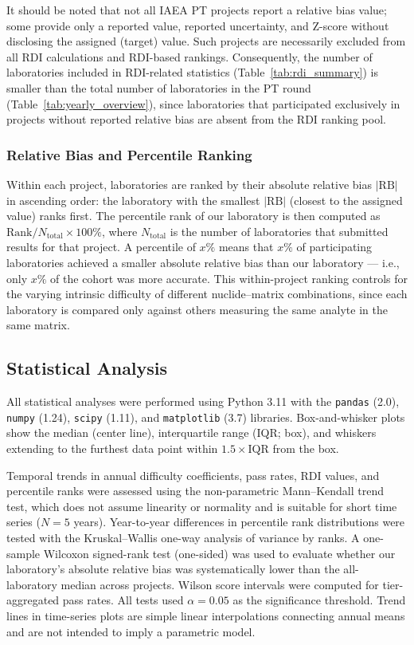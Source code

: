 \documentclass[12pt,a4paper,twoside]{article}
\begin{document}
It should be noted that not all IAEA PT projects report a relative bias value; some provide only a reported value, reported uncertainty, and Z-score without disclosing the assigned (target) value. Such projects are necessarily excluded from all RDI calculations and RDI-based rankings. Consequently, the number of laboratories included in RDI-related statistics (Table~\ref{tab:rdi_summary}) is smaller than the total number of laboratories in the PT round (Table~\ref{tab:yearly_overview}), since laboratories that participated exclusively in projects without reported relative bias are absent from the RDI ranking pool.

\subsubsection{Relative Bias and Percentile Ranking}

Within each project, laboratories are ranked by their absolute relative bias $|\text{RB}|$ in ascending order: the laboratory with the smallest $|\text{RB}|$ (closest to the assigned value) ranks first. The percentile rank of our laboratory is then computed as $\text{Rank}/N_{\text{total}} \times 100\%$, where $N_{\text{total}}$ is the number of laboratories that submitted results for that project. A percentile of $x\%$ means that $x\%$ of participating laboratories achieved a smaller absolute relative bias than our laboratory — i.e., only $x\%$ of the cohort was more accurate. This within-project ranking controls for the varying intrinsic difficulty of different nuclide--matrix combinations, since each laboratory is compared only against others measuring the same analyte in the same matrix.

\subsection{Statistical Analysis}

All statistical analyses were performed using Python 3.11 with the \texttt{pandas} (2.0), \texttt{numpy} (1.24), \texttt{scipy} (1.11), and \texttt{matplotlib} (3.7) libraries. Box-and-whisker plots show the median (center line), interquartile range (IQR; box), and whiskers extending to the furthest data point within $1.5 \times \text{IQR}$ from the box.

Temporal trends in annual difficulty coefficients, pass rates, RDI values, and percentile ranks were assessed using the non-parametric Mann--Kendall trend test, which does not assume linearity or normality and is suitable for short time series ($N = 5$ years). Year-to-year differences in percentile rank distributions were tested with the Kruskal--Wallis one-way analysis of variance by ranks. A one-sample Wilcoxon signed-rank test (one-sided) was used to evaluate whether our laboratory's absolute relative bias was systematically lower than the all-laboratory median across projects. Wilson score intervals were computed for tier-aggregated pass rates. All tests used $\alpha = 0.05$ as the significance threshold. Trend lines in time-series plots are simple linear interpolations connecting annual means and are not intended to imply a parametric model.
\end{document}
